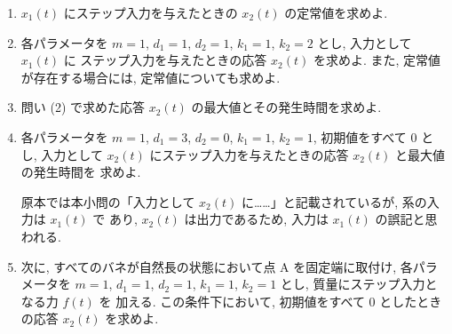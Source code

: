 \begin{enumerate}[label=(\arabic*)]
  \item $x_1(t)$ にステップ入力を与えたときの $x_2(t)$ の定常値を求めよ.

  \item 各パラメータを $m=1$, $d_1=1$, $d_2=1$, $k_1=1$, $k_2=2$ とし, 入力として $x_1(t)$ に
        ステップ入力を与えたときの応答 $x_2(t)$ を求めよ. また, 定常値が存在する場合には,
        定常値についても求めよ.

  \item 問い (2) で求めた応答 $x_2(t)$ の最大値とその発生時間を求めよ.

  \item 各パラメータを $m=1$, $d_1=3$, $d_2=0$, $k_1=1$, $k_2=1$, 初期値をすべて $0$ とし,
        入力として $x_2(t)$ にステップ入力を与えたときの応答 $x_2(t)$ と最大値の発生時間を
        求めよ.

  \begin{rem}
  原本では本小問の「入力として $x_2(t)$ に……」と記載されているが, 系の入力は $x_1(t)$ で
  あり, $x_2(t)$ は出力であるため, 入力は $x_1(t)$ の誤記と思われる.
  \end{rem}

  \item 次に, すべてのバネが自然長の状態において点 A を固定端に取付け, 各パラメータを
        $m=1$, $d_1=1$, $d_2=1$, $k_1=1$, $k_2=1$ とし, 質量にステップ入力となる力 $f(t)$ を
        加える. この条件下において, 初期値をすべて $0$ としたときの応答 $x_2(t)$ を求めよ.
\end{enumerate}
